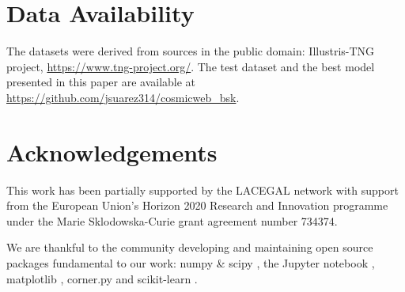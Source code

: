 \documentclass[usenatbib]{mnras}
\begin{document}
\section*{Data Availability}
The datasets were derived from sources in the public domain: Illustris-TNG project, \url{https://www.tng-project.org/}.
The test dataset and the best model presented in this paper are available at \url{https://github.com/jsuarez314/cosmicweb_bsk}.

\section*{Acknowledgements}

This work has been partially supported by the LACEGAL network with support from the European Union's Horizon 2020 Research and Innovation programme under the Marie Sklodowska-Curie grant agreement number 734374.

We are thankful to the community developing and maintaining open source packages fundamental to our work: numpy
\&  scipy  \citep{VanDerWalt2011},  the  Jupyter  notebook  \citep{Kluyver2016}, matplotlib \citep{Hunter2007}, corner.py \citep{Foreman-Mackey2016} and  scikit-learn \citep{Pedregosa2011}.






\bsp	%
\label{lastpage}
\end{document}
